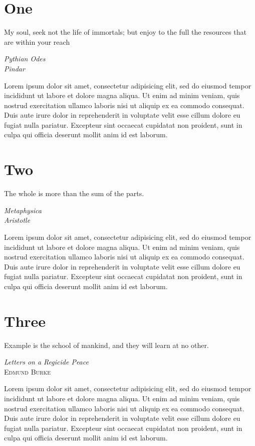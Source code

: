 \documentclass{article}
\begin{document}
\section{One}
\epigraph{My soul, seek not the life of immortals; but enjoy to the full the resources
that are within your reach}{\textsl{Pythian Odes}\\\textsl{Pindar}}

Lorem ipsum dolor sit amet, consectetur adipisicing elit, sed do eiusmod tempor incididunt ut labore et dolore magna aliqua. Ut enim ad minim veniam, quis nostrud exercitation ullamco laboris nisi ut aliquip ex ea commodo consequat. Duis aute irure dolor in reprehenderit in voluptate velit esse cillum dolore eu fugiat nulla pariatur. Excepteur sint occaecat cupidatat non proident, sunt in culpa qui officia deserunt mollit anim id est laborum.

\section{Two}
\def\epigraphflush{center}
\epigraph{The whole is more than the sum of the parts.}{\textsl{Metaphysica}\\\textsl{Aristotle}}
Lorem ipsum dolor sit amet, consectetur adipisicing elit, sed do eiusmod tempor incididunt ut labore et dolore magna aliqua. Ut enim ad minim veniam, quis nostrud exercitation ullamco laboris nisi ut aliquip ex ea commodo consequat. Duis aute irure dolor in reprehenderit in voluptate velit esse cillum dolore eu fugiat nulla pariatur. Excepteur sint occaecat cupidatat non proident, sunt in culpa qui officia deserunt mollit anim id est laborum.

\section{Three}
\def\epigraphflush{flushleft}
\def\textflush{flushright}
\def\sourceflush{flushleft}

\epigraph{Example is the school of mankind, and they will learn at no other.
}{\textsl{Letters on a Regicide Peace}\\\textsc{Edmund Burke}}
Lorem ipsum dolor sit amet, consectetur adipisicing elit, sed do eiusmod tempor incididunt ut labore et dolore magna aliqua. Ut enim ad minim veniam, quis nostrud exercitation ullamco laboris nisi ut aliquip ex ea commodo consequat. Duis aute irure dolor in reprehenderit in voluptate velit esse cillum dolore eu fugiat nulla pariatur. Excepteur sint occaecat cupidatat non proident, sunt in culpa qui officia deserunt mollit anim id est laborum.
\end{document}
